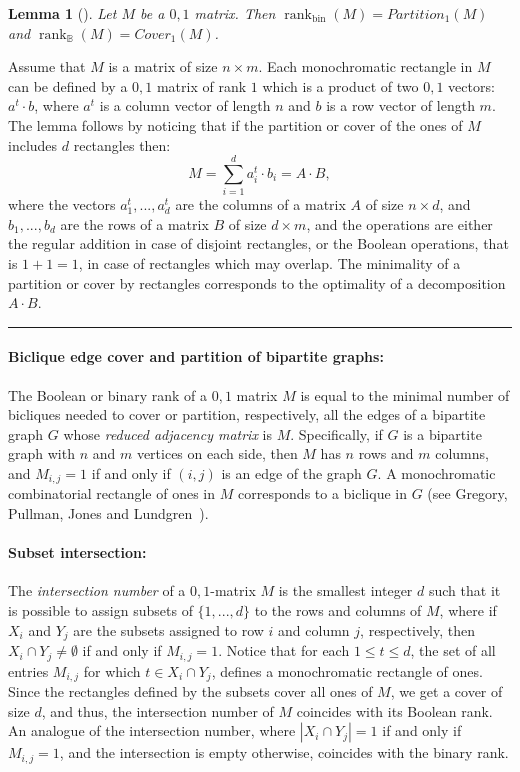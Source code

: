 \documentclass[11pt]{article}
\newtheorem{lemma}[theorem]{Lemma}
\newcommand{\qedsymb}{\hfill{\rule{2mm}{2mm}}}
\renewenvironment{proof}[1][]{\begin{trivlist}
\item[\hspace{\labelsep}{\bf\noindent Proof#1:\/}] }{\qedsymb\end{trivlist}}
\newcommand{\rank}{\mathop{\mathrm{rank}}}
\newcommand{\Rbool}{{\rank}_\mathbb{B}}
\newcommand{\Rbin}{{\rank}_{\mathrm{bin}}}
\begin{document}
\begin{lemma}[\cite{Gregory}]
Let $M$ be a $0,1$ matrix. Then $\Rbin(M) = Partition_1(M)$ and $\Rbool(M) = Cover_1(M)$.
\end{lemma}
\begin{proof}
Assume that $M$ is a matrix of size $n \times m$.
Each monochromatic rectangle in $M$ can be defined by a $0,1$ matrix of rank $1$ which is a product of two $0,1$ vectors: $a^t \cdot b$,
where $a^t$ is a column vector of length $n$ and $b$ is a row vector of length $m$.
The lemma follows by noticing that if the partition or cover of the ones of $M$ includes $d$ rectangles then:
$$M = \sum_{ i= 1}^d a^t_i \cdot b_i = A \cdot B,$$
where the vectors $a^t_1,...,a^t_d$ are the columns of a matrix $A$ of size $n \times d$, and $b_1,...,b_d$ are the rows of a matrix $B$
of size $d \times m$,
and the operations are either the regular addition in case of disjoint rectangles, or the Boolean operations, that is $1+1 = 1$, in case of rectangles which may overlap.
The minimality of a partition or cover by rectangles corresponds to the optimality of a decomposition $A \cdot B$.
\end{proof}


\vspace{-0.5 cm}
\paragraph{Biclique edge cover and partition of bipartite graphs:}
The Boolean or binary rank of a $0,1$ matrix $M$ is equal to the minimal number of bicliques needed to cover or partition, respectively, all the
edges of a bipartite graph $G$ whose {\em reduced adjacency matrix} is $M$.
Specifically, if $G$ is a bipartite graph with $n$ and $m$ vertices on each side, then $M$ has $n$ rows and $m$ columns,
and $M_{i,j} = 1$  if and only if $(i,j)$ is an edge of the graph $G$.
A monochromatic combinatorial rectangle of ones in $M$ corresponds to a biclique in $G$ (see Gregory, Pullman, Jones and Lundgren~\cite{Gregory}).

\vspace{-0.5 cm}
\paragraph{Subset intersection:}
The {\em intersection number} of a $0,1$-matrix $M$ is the smallest integer $d$ such that it is possible to assign
subsets  of $ \{1,...,d\}$ to the rows and columns of  $M$,
where if $X_i$ and $Y_j$ are the subsets assigned to row $i$ and column $j$, respectively, then $X_i \cap Y_j \neq \emptyset$ if and only if $M_{i,j} = 1$.
Notice that for each $1 \leq t \leq d$, the set of all entries $M_{i,j}$ for which $t \in X_i \cap Y_j$, defines a monochromatic rectangle of ones.
Since the rectangles defined by the subsets cover all ones of $M$, we get a cover of size $d$, and thus, the intersection number of $M$ coincides with its Boolean rank.
An analogue of the intersection number, where $|X_i \cap Y_j| = 1$ if and only if $M_{i,j} = 1$, and the intersection is empty otherwise,
coincides with the binary rank.
\end{document}
